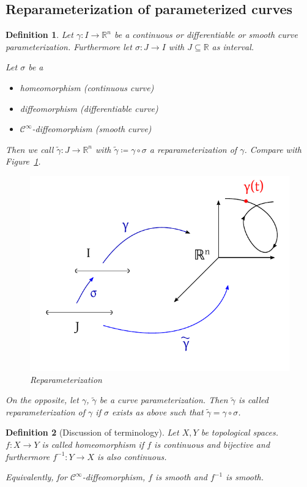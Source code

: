 \documentclass{article}
\newtheorem{definition}{Definition}  \numberwithin{definition}{section}
\begin{document}
\subsection{Reparameterization of parameterized curves}
\begin{definition} %
  Let $\gamma: I \to \mathbb R^n$ be a continuous or differentiable or smooth curve parameterization.
  Furthermore let $\sigma: J \to I$ with $J \subseteq \mathbb R$ as interval.

  Let $\sigma$ be a
  \begin{itemize}
    \item homeomorphism (continuous curve)
    \item diffeomorphism (differentiable curve)
    \item $\mathcal C^\infty$-diffeomorphism (smooth curve)
  \end{itemize}
  Then we call $\tilde \gamma: J \to \mathbb R^n$ with $\tilde \gamma \coloneqq \gamma \circ \sigma$ a \emph{reparameterization} of $\gamma$.
  Compare with Figure~\ref{img:reparam}.

  \begin{figure}[t]
    \begin{center}
      \includegraphics[width=.7\textwidth]{img/40_reparameterization.pdf}
      \caption{Reparameterization}
      \label{img:reparam}
    \end{center}
  \end{figure}

  On the opposite, let $\gamma$, $\tilde \gamma$ be a curve parameterization. Then $\tilde\gamma$ is called reparameterization of $\gamma$ if $\sigma$ exists as above such that $\tilde \gamma = \gamma \circ \sigma$.
\end{definition}

\begin{definition}[Discussion of terminology]
  Let $X, Y$ be topological spaces. $f: X \to Y$ is called \emph{homeomorphism}
  if $f$ is continuous and bijective and furthermore $f^{-1}: Y \to X$ is also continuous.

  Equivalently, for $\mathcal C^\infty$-diffeomorphism, $f$ is smooth and $f^{-1}$ is smooth.
\end{definition}
\end{document}
